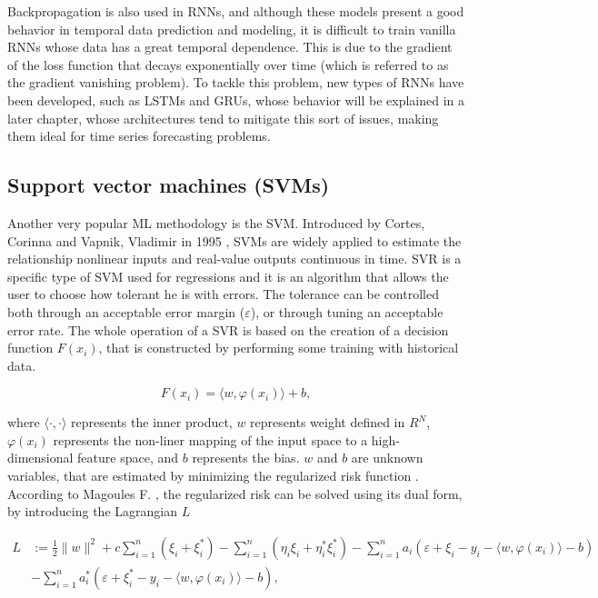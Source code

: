 Backpropagation is also used in \ac{RNN}s, and although these models present a good behavior in temporal data prediction and modeling, it is difficult to train vanilla \ac{RNN}s whose data has a great temporal dependence. This is due to the gradient of the loss function that decays exponentially over time (which is referred to as the gradient vanishing problem)\cite{rnn4}. To tackle this problem, new types of \ac{RNN}s have been developed, such as \ac{LSTM}s and \ac{GRU}s, whose behavior will be explained in a later chapter, whose architectures tend to mitigate this sort of issues, making them ideal for time series forecasting problems.

\subsection{Support vector machines (SVMs)}

Another very popular \ac{ML} methodology is the \ac{SVM}. Introduced by Cortes, Corinna and Vapnik, Vladimir in 1995 \cite{svm1}, \ac{SVM}s are widely applied to estimate the relationship nonlinear inputs and real-value outputs continuous in time. \ac{SVR} is a specific type of \ac{SVM} used for regressions and it is an algorithm that allows the user to choose how tolerant he is with errors. The tolerance can be controlled both through an acceptable error margin ($\varepsilon$), or through tuning an acceptable error rate. The whole operation of a \ac{SVR} is based on the creation of a decision function $F(x_i)$, that is constructed by performing some training with historical data.

\begin{equation}
   F(x_i) = \langle w, \varphi(x_i) \rangle + b,
   \label{svmdec}
\end{equation}

where $\langle\cdot,\cdot\rangle$ represents the inner product, $w$ represents weight defined in $R^N$, $\varphi(x_i)$ represents the non-liner mapping of the input space to a high-dimensional feature space, and $b$ represents the bias\cite{svm2}. $w$ and $b$ are unknown variables, that are estimated by minimizing the regularized risk function \cite{svm2}. According to Magoules F. \cite{ann1}, the regularized risk can be solved using its dual form, by introducing the Lagrangian $L$

\begin{equation}
\begin{split}
       L & := \frac{1}{2}\parallel w \parallel^2 + c \sum_{i=1}^{n}(\xi_i + \xi_i^*) - \sum_{i=1}^{n}(\eta_i\xi_i + \eta_i^*\xi_i^*) - \sum_{i=1}^{n}a_i(\varepsilon + \xi_i - y_i- \langle w, \varphi(x_i) \rangle - b) \\ 
         & - \sum_{i=1}^{n}a_i^*(\varepsilon + \xi_i^* - y_i- \langle w, \varphi(x_i) \rangle - b),
\end{split}
\end{equation}

